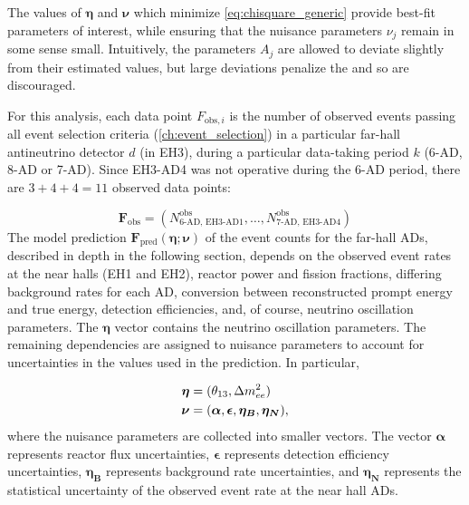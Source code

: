 The values of $\boldsymbol{\eta}$ and $\boldsymbol{\nu}$
which minimize \cref{eq:chisquare_generic}
provide best-fit parameters of interest,
while ensuring that the nuisance parameters $\nu_j$
remain in some sense small.
Intuitively, the parameters $A_j$ are allowed to deviate slightly
from their estimated values,
but large deviations penalize the \chisquare{} and so are discouraged.

For this analysis, each data point $F_{\text{obs},i}$
is the number of observed events passing all event selection criteria
(\cref{ch:event_selection})
in a particular far-hall antineutrino detector $d$ (in EH3),
during a particular data-taking period $k$ (6-AD, 8-AD or 7-AD).
Since EH3-AD4 was not operative during the 6-AD period,
there are $3 + 4 + 4 = 11$ observed data points:

\begin{equation}
    \mathbf{F}_{\text{obs}} =
    (N^{\text{obs}}_{\text{6-AD, EH3-AD1}}, \ldots, N^{\text{obs}}_{\text{7-AD, EH3-AD4}})
\end{equation}
The model prediction
$\mathbf{F}_{\text{pred}}(\boldsymbol{\eta};\boldsymbol{\nu})$
of the event counts for the far-hall ADs,
described in depth in the following section,
depends on the observed event rates at the near halls (EH1 and EH2),
reactor power and fission fractions,
differing background rates for each AD,
conversion between reconstructed prompt energy and true \nuebar{} energy,
detection efficiencies,
and, of course, neutrino oscillation parameters.
The $\boldsymbol{\eta}$ vector contains the neutrino oscillation parameters.
The remaining dependencies are assigned to nuisance parameters
to account for uncertainties in the values used in the prediction.
In particular,

\begin{align}
    \begin{split}
        \boldsymbol{\eta} &= (\theta_{13}, \Delta m^2_{ee}) \\
        \boldsymbol{\nu} &= (
            \boldsymbol{\alpha},
            \boldsymbol{\epsilon},
            \boldsymbol{\eta_B},
            \boldsymbol{\eta_N}),
    \end{split}
\end{align}
where the nuisance parameters are collected into smaller vectors.
The vector $\boldsymbol{\alpha}$ represents reactor flux uncertainties,
$\boldsymbol{\epsilon}$ represents detection efficiency uncertainties,
$\boldsymbol{\eta_B}$ represents background rate uncertainties,
and $\boldsymbol{\eta_N}$ represents the statistical uncertainty
of the observed event rate at the near hall ADs.

